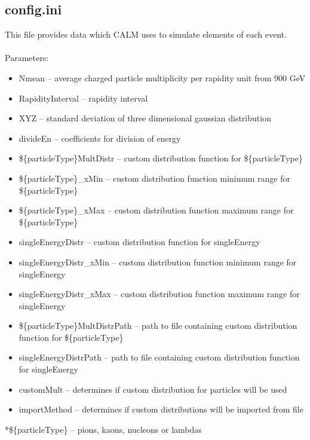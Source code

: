 \subsection{config.ini}
This file provides data which CALM uses to simulate elements of each event.\\\\
Parameters:
\begin{itemize}
    \item Nmean -- average charged particle multiplicity per rapidity unit from 900 GeV
    \item RapidityInterval -- rapidity interval
    \item XYZ -- standard deviation of three dimensional gaussian distribution
    \item divideEn -- coefficients for division of energy
    \item \$\{particleType\}MultDistr -- custom distribution function for \$\{particleType\}
    \item \$\{particleType\}\_xMin -- custom distribution function minimum range for \$\{particleType\}
    \item \$\{particleType\}\_xMax -- custom distribution function maximum range for \$\{particleType\}
    \item singleEnergyDistr -- custom distribution function for singleEnergy
    \item singleEnergyDistr\_xMin -- custom distribution function minimum range for singleEnergy
    \item singleEnergyDistr\_xMax -- custom distribution function maximum range for singleEnergy   
    \item \$\{particleType\}MultDistrPath -- path to file containing custom distribution function for \$\{particleType\}
    \item singleEnergyDistrPath -- path to file containing custom distribution function for singleEnergy
    \item customMult -- determines if custom distribution for particles will be used
    \item importMethod -- determines if custom distributions will be imported from file
\end{itemize}
*\$\{particleType\} -- pions, kaons, nucleons or lambdas